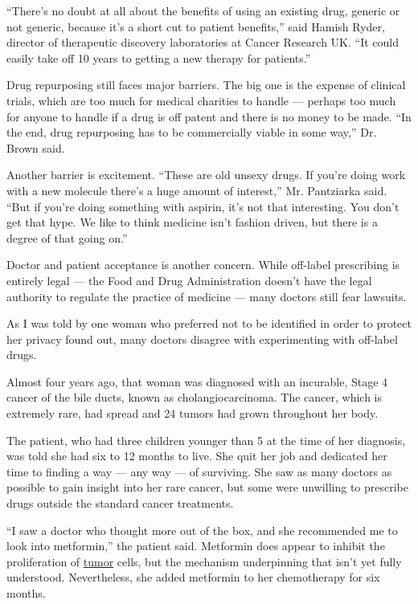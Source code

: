 ``There's no doubt at all about the benefits of using an existing drug,
generic or not generic, because it's a short cut to patient benefits,''
said Hamish Ryder, director of therapeutic discovery laboratories at
Cancer Research UK. ``It could easily take off 10 years to getting a new
therapy for patients.''

Drug repurposing still faces major barriers. The big one is the expense
of clinical trials, which are too much for medical charities to handle
--- perhaps too much for anyone to handle if a drug is off patent and
there is no money to be made. ``In the end, drug repurposing has to be
commercially viable in some way,'' Dr. Brown said.

Another barrier is excitement. ``These are old unsexy drugs. If you're
doing work with a new molecule there's a huge amount of interest,'' Mr.
Pantziarka said. ``But if you're doing something with aspirin, it's not
that interesting. You don't get that hype. We like to think medicine
isn't fashion driven, but there is a degree of that going on.''

Doctor and patient acceptance is another concern. While off-label
prescribing is entirely legal --- the Food and Drug Administration
doesn't have the legal authority to regulate the practice of medicine
--- many doctors still fear lawsuits.

As I was told by one woman who preferred not to be identified in order
to protect her privacy found out, many doctors disagree with
experimenting with off-label drugs.

Almost four years ago, that woman was diagnosed with an incurable, Stage
4 cancer of the bile ducts, known as cholangiocarcinoma. The cancer,
which is extremely rare, had spread and 24 tumors had grown throughout
her body.

The patient, who had three children younger than 5 at the time of her
diagnosis, was told she had six to 12 months to live. She quit her job
and dedicated her time to finding a way --- any way --- of surviving.
She saw as many doctors as possible to gain insight into her rare
cancer, but some were unwilling to prescribe drugs outside the standard
cancer treatments.

``I saw a doctor who thought more out of the box, and she recommended me
to look into metformin,'' the patient said. Metformin does appear to
inhibit the proliferation of
\href{https://www.spandidos-publications.com/10.3892/ol.2017.7412}{tumor}
cells, but the mechanism underpinning that isn't yet fully understood.
Nevertheless, she added metformin to her chemotherapy for six months.

